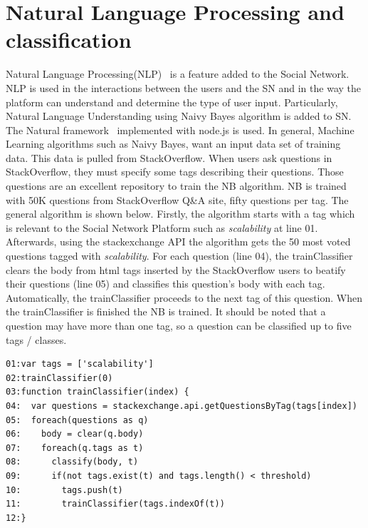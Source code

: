 \section{Natural Language Processing and classification}
Natural Language Processing(NLP)~\cite{manning1999foundations} is a feature added to the Social Network. NLP is used in the interactions between the users and the SN and in the way the platform can understand and determine the type of user input. Particularly, Natural Language Understanding using Naivy Bayes algorithm is added to SN. The Natural framework~\cite{nodenatural_url} implemented with node.js is used. In general, Machine Learning algorithms such as Naivy Bayes, want an input data set of training data. This data is pulled from StackOverflow. When users ask questions in StackOverflow, they must specify some tags describing their questions. Those questions are an excellent repository to train the NB algorithm. NB is trained with 50K questions from StackOverflow Q\&A site, fifty questions per tag. The general algorithm is shown below. Firstly, the algorithm starts with a tag which is relevant to the Social Network Platform such as \emph{scalability} at line 01. Afterwards, using the stackexchange API the algorithm gets the 50 most voted questions tagged with \emph{scalability}. For each question (line 04), the trainClassifier clears the body from html tags inserted by the StackOverflow users to beatify their questions (line 05) and classifies this question's body with each tag. Automatically, the trainClassifier proceeds to the next tag of this question. When the trainClassifier is finished the NB is trained. It should be noted that a question may have more than one tag, so a question can be classified up to five tags / classes.

\begin{lstlisting} 
01:var tags = ['scalability']
02:trainClassifier(0)
03:function trainClassifier(index) {
04:  var questions = stackexchange.api.getQuestionsByTag(tags[index])
05:  foreach(questions as q)
06:    body = clear(q.body)
07:    foreach(q.tags as t)
08:    	 classify(body, t)
09:    	 if(not tags.exist(t) and tags.length() < threshold)
10:    	   tags.push(t)	  
11:        trainClassifier(tags.indexOf(t))
12:}		
\end{lstlisting}